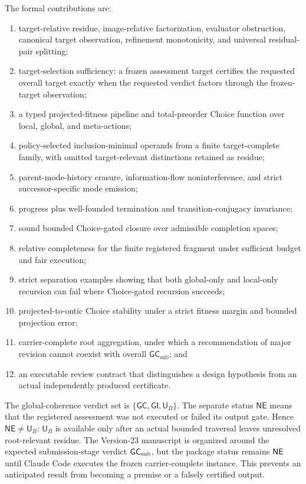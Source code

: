 \documentclass[10pt]{article}
\newcommand{\GC}{\mathsf{GC}}
\newcommand{\GI}{\mathsf{GI}}
\newcommand{\UB}{\mathsf{U}_B}
\newcommand{\NE}{\mathsf{NE}}
\newcommand{\GCsub}{\mathsf{GC}_{\mathrm{sub}}}
\begin{document}
The formal contributions are:
\begin{enumerate}
  \item target-relative residue, image-relative factorization, evaluator obstruction, canonical target observation, refinement monotonicity, and universal residual-pair splitting;
  \item target-selection sufficiency: a frozen assessment target certifies the requested overall target exactly when the requested verdict factors through the frozen-target observation;
  \item a typed projected-fitness pipeline and total-preorder Choice function over local, global, and meta-actions;
  \item policy-selected inclusion-minimal operands from a finite target-complete family, with omitted target-relevant distinctions retained as residue;
  \item parent-mode-history erasure, information-flow noninterference, and strict successor-specific mode emission;
  \item progress plus well-founded termination and transition-conjugacy invariance;
  \item sound bounded Choice-gated closure over admissible completion spaces;
  \item relative completeness for the finite registered fragment under sufficient budget and fair execution;
  \item strict separation examples showing that both global-only and local-only recursion can fail where Choice-gated recursion succeeds;
  \item projected-to-ontic Choice stability under a strict fitness margin and bounded projection error;
  \item carrier-complete root aggregation, under which a recommendation of major revision cannot coexist with overall $\GCsub$; and
  \item an executable review contract that distinguishes a design hypothesis from an actual independently produced certificate.
\end{enumerate}

The global-coherence verdict set is $\{\GC,\GI,\UB\}$.  The separate status $\NE$ means that the registered assessment was not executed or failed its output gate.  Hence $\NE\neq\UB$: $\UB$ is available only after an actual bounded traversal leaves unresolved root-relevant residue.  The Version-23 manuscript is organized around the expected submission-stage verdict $\ExpectedOverallGCA$, but the package status remains $\ActualOverallGCA$ until Claude Code executes the frozen carrier-complete instance.  This prevents an anticipated result from becoming a premise or a falsely certified output.
\end{document}
